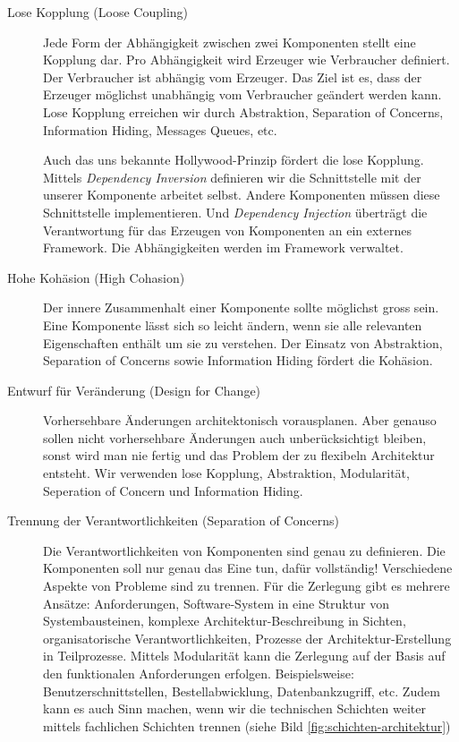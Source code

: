 \begin{description}
	\item[Lose Kopplung (Loose Coupling)] Jede Form der Abhängigkeit zwischen zwei Komponenten stellt eine Kopplung dar. Pro Abhängigkeit wird Erzeuger wie Verbraucher definiert. Der Verbraucher ist abhängig vom Erzeuger. Das Ziel ist es, dass der Erzeuger möglichst unabhängig vom Verbraucher geändert werden kann. Lose Kopplung erreichen wir durch Abstraktion, Separation of Concerns, Information Hiding, Messages Queues, etc.
	
	Auch das uns bekannte Hollywood-Prinzip fördert die lose Kopplung. Mittels \emph{Dependency Inversion} definieren wir die Schnittstelle mit der unserer Komponente arbeitet selbst. Andere Komponenten müssen diese Schnittstelle implementieren. Und \emph{Dependency Injection} überträgt die Verantwortung für das Erzeugen von Komponenten an ein externes Framework. Die Abhängigkeiten werden im Framework verwaltet.
	
	\item[Hohe Kohäsion (High Cohasion)] Der innere Zusammenhalt einer Komponente sollte möglichst gross sein. Eine Komponente lässt sich so leicht ändern, wenn sie alle relevanten Eigenschaften enthält um sie zu verstehen. Der Einsatz von Abstraktion, Separation of Concerns sowie Information Hiding fördert die Kohäsion.
		
	\item[Entwurf für Veränderung (Design for Change)] Vorhersehbare Änderungen architektonisch vorausplanen. Aber genauso sollen nicht vorhersehbare Änderungen auch unberücksichtigt bleiben, sonst wird man nie fertig und das Problem der zu flexibeln Architektur entsteht. Wir verwenden lose Kopplung, Abstraktion, Modularität, Seperation of Concern und Information Hiding.
	
	\item[Trennung der Verantwortlichkeiten (Separation of Concerns)] Die Verantwortlichkeiten von Komponenten sind genau zu definieren. Die Komponenten soll nur genau das Eine tun, dafür vollständig! Verschiedene Aspekte von Probleme sind zu trennen. Für die Zerlegung gibt es mehrere Ansätze: Anforderungen, Software-System in eine Struktur von Systembausteinen, komplexe Architektur-Beschreibung in Sichten, organisatorische Verantwortlichkeiten, Prozesse der Architektur-Erstellung in Teilprozesse.
	Mittels Modularität kann die Zerlegung auf der Basis auf den funktionalen Anforderungen erfolgen. Beispielsweise: Benutzerschnittstellen, Bestellabwicklung, Datenbankzugriff, etc. Zudem kann es auch Sinn machen, wenn wir die technischen Schichten weiter mittels fachlichen Schichten trennen (siehe Bild \ref{fig:schichten-architektur})
	

\end{description}
